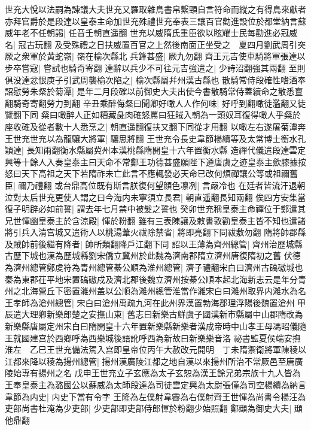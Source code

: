 世充大悅以法嗣為諫議大夫世充又羅取雜鳥書帛繫頸自言符命而縱之有得鳥來獻者亦拜官爵於是段達以皇泰主命加世充殊禮世充奉表三讓百官勸進設位於都堂納言蘇威年老不任朝謁|{
	任音壬朝直遥翻}
世充以威隋氏重臣欲以眩耀士民每勸進必冠威名|{
	冠古玩翻}
及受殊禮之日扶威置百官之上然後南面正坐受之　夏四月劉武周引突厥之衆軍於黄蛇嶺|{
	嶺在榆次縣北}
兵鋒甚盛|{
	厥九勿翻}
齊王元吉使車騎將軍張達以步卒嘗寇|{
	嘗試也騎奇寄翻}
達辭以兵少不可往元吉強遣之|{
	少詩沼翻強其兩翻}
至則俱没達忿恨庚子引武周襲榆次陷之|{
	榆次縣屬幷州漢古縣也}
散騎常侍段確性嗜酒奉詔慰勞朱粲於菊潭|{
	是年二月段確以前御史大夫出使今書散騎常侍蓋續命之散悉亶翻騎奇寄翻勞力到翻}
辛丑乘醉侮粲曰聞卿好噉人人作何味|{
	好呼到翻噉徒濫翻又徒覽翻下同}
粲曰噉醉人正如糟藏彘肉確怒罵曰狂賊入朝為一頭奴耳復得噉人乎粲於座收確及從者數十人悉烹之|{
	朝直遥翻復扶又翻下同從才用翻}
以噉左右遂屠菊潭奔王世充世充以為龍驤大將軍|{
	驤思將翻}
王世充令長史韋節楊續等及太常博士衡水孔穎達|{
	長知兩翻衡水縣屬冀州本漢桃縣隋開皇十六年置衡水縣}
造禪代儀遣段達雲定興等十餘人入奏皇泰主曰天命不常鄭王功德甚盛願陛下遵唐虞之迹皇泰主歛膝據按怒曰天下高祖之天下若隋祚未亡此言不應輒發必天命已改何煩禪讓公等或祖禰舊臣|{
	禰乃禮翻}
或台鼎高位既有斯言朕復何望顔色凛冽|{
	言嚴冷也}
在廷者皆流汗退朝泣對太后世充更使人謂之曰今海内未寧須立長君|{
	朝直遥翻長知兩翻}
俟四方安集當復子明辟必如前誓|{
	謂去年七月禁中被髮之誓也}
癸卯世充稱皇泰主命禪位于鄭遣其兄世惲幽皇泰主於含涼殿|{
	惲於粉翻}
雖有三表陳讓及敕書敦勸皇泰主皆不知也遣諸將引兵入清宫城又遣術人以桃湯葦火祓除禁省|{
	將即亮翻下同祓敷勿翻}
隋將帥郡縣及賊帥前後繼有降者|{
	帥所類翻降戶江翻下同}
詔以王薄為齊州總管|{
	齊州治歷城縣古歷下城也漢為歷城縣劉宋僑立冀州於此魏為濟南郡隋立濟州唐復隋初之舊}
伏德為濟州總管鄭䖍符為青州總管綦公順為淮州總管|{
	濟子禮翻宋白曰濟州古碻磝城也秦為東郡茌平地宋置碻磝戍及濟北郡後魏立濟州按綦公順本起北海新志云是年分青州之北海營丘下密置濰州盖以公順為濰州總管淮當作濰宋白曰濰州取界内濰水為名}
王孝師為滄州總管|{
	宋白曰滄州禹疏九河在此州界漢置勃海郡理浮陽後魏置滄州}
甲辰遣大理卿新樂郎楚之安撫山東|{
	舊志曰新樂古鮮虞子國漢新市縣屬中山郡隋改為新樂縣唐屬定州宋白曰隋開皇十六年置新樂縣新樂者漢成帝時中山孝王母馮昭儀隨王就國建宫於西鄉呼為西樂城後語訛呼西為新故曰新樂樂音洛}
祕書監夏侯端安撫淮左　乙巳王世充備法駕入宫即皇帝位丙午大赦改元開明　丁未隋禦衛將軍陳稜以江都來降以稜為揚州總管|{
	揚州漢廣陵江都之地自漢以來揚州所治不常厥邑至唐廣陵始專有揚州之名}
戊申王世充立子玄應為太子玄恕為漢王餘兄弟宗族十九人皆為王奉皇泰主為潞國公以蘇威為太師段達為司徒雲定興為太尉張僅為司空楊續為納言韋節為内史|{
	内史下當有令字}
王隆為左僕射韋霽為右僕射齊王世惲為尚書令楊汪為吏部尚書杜淹為少吏部|{
	少吏部即吏部侍郎惲於粉翻少始照翻}
鄭頲為御史大夫|{
	頲他鼎翻}
